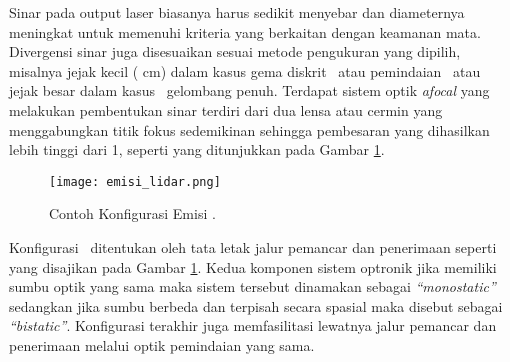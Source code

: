     Sinar pada output laser biasanya harus sedikit menyebar dan diameternya meningkat untuk memenuhi kriteria yang berkaitan dengan keamanan mata. Divergensi sinar juga disesuaikan sesuai metode pengukuran yang dipilih, misalnya jejak kecil ( cm) dalam kasus gema diskrit \lidar\ atau pemindaian \lidar\ atau jejak besar dalam kasus \lidar\ gelombang penuh. Terdapat sistem optik \textit{afocal} yang melakukan pembentukan sinar terdiri dari dua lensa atau cermin yang menggabungkan titik fokus sedemikinan sehingga pembesaran yang dihasilkan lebih tinggi dari 1, seperti yang ditunjukkan pada Gambar \ref*{fig:Ch02_lidar_emisi}.
    \begin{figure}[H]
        \centering
        \texttt{[image: emisi\_lidar.png]}
        \caption{Contoh Konfigurasi Emisi \lidar\cite{bs9}.}
        \label{fig:Ch02_lidar_emisi}
    \end{figure}
    
    Konfigurasi \lidar\ ditentukan oleh tata letak jalur pemancar dan penerimaan seperti yang disajikan pada Gambar \ref*{fig:Ch02_lidar_emisi}. Kedua komponen sistem optronik jika memiliki sumbu optik yang sama maka sistem tersebut dinamakan sebagai \textit{“monostatic”} sedangkan jika sumbu berbeda dan terpisah secara spasial maka disebut sebagai \textit{“bistatic”}. Konfigurasi terakhir juga memfasilitasi lewatnya jalur pemancar dan penerimaan melalui optik pemindaian yang sama.
    

